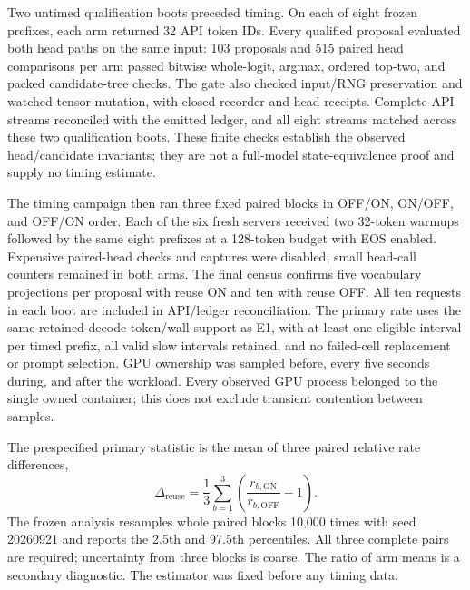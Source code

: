 Two untimed qualification boots preceded timing. On each of eight frozen prefixes, each arm returned 32 API token IDs. Every qualified proposal evaluated both head paths on the same input: 103 proposals and 515 paired head comparisons per arm passed bitwise whole-logit, argmax, ordered top-two, and packed candidate-tree checks. The gate also checked input/RNG preservation and watched-tensor mutation, with closed recorder and head receipts. Complete API streams reconciled with the emitted ledger, and all eight streams matched across these two qualification boots. These finite checks establish the observed head/candidate invariants; they are not a full-model state-equivalence proof and supply no timing estimate.

The timing campaign then ran three fixed paired blocks in OFF/ON, ON/OFF, and OFF/ON order. Each of the six fresh servers received two 32-token warmups followed by the same eight prefixes at a 128-token budget with EOS enabled. Expensive paired-head checks and captures were disabled; small head-call counters remained in both arms. The final census confirms five vocabulary projections per proposal with reuse ON and ten with reuse OFF. All ten requests in each boot are included in API/ledger reconciliation. The primary rate uses the same retained-decode token/wall support as E1, with at least one eligible interval per timed prefix, all valid slow intervals retained, and no failed-cell replacement or prompt selection. GPU ownership was sampled before, every five seconds during, and after the workload. Every observed GPU process belonged to the single owned container; this does not exclude transient contention between samples.

The prespecified primary statistic is the mean of three paired relative rate differences,
\begin{equation}
 \Delta_{\mathrm{reuse}}=\frac{1}{3}\sum_{b=1}^{3}
 \left(\frac{r_{b,\mathrm{ON}}}{r_{b,\mathrm{OFF}}}-1\right).
\end{equation}
The frozen analysis resamples whole paired blocks 10,000 times with seed 20260921 and reports the 2.5th and 97.5th percentiles. All three complete pairs are required; uncertainty from three blocks is coarse. The ratio of arm means is a secondary diagnostic. The estimator was fixed before any timing data.

\begin{table}[t]
\caption{E8, local-document continuation: all three paired B1 blocks on the same eight excerpts as E1. Rates are retained-decode tokens/s for the source-controlled head-reuse comparison. The final ON boot has different continuations and one early EOS; it remains in the primary analysis.}
\label{tab:e8-reuse}
\centering\footnotesize

\end{table}

